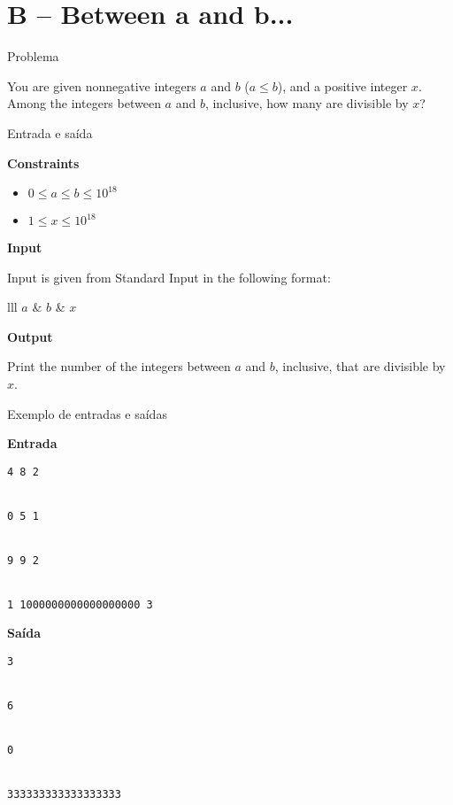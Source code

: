 \section{B -- Between a and b...}

\begin{frame}[fragile]{Problema}

You are given nonnegative integers $a$ and $b$ ($a\leq b$), and a positive integer $x$. Among 
the integers between $a$ and $b$, inclusive, how many are divisible by $x$?

\end{frame}

\begin{frame}[fragile]{Entrada e saída}

\textbf{Constraints}

\begin{itemize}
    \item $0\leq a\leq b\leq 10^{18}$
    \item $1\leq x\leq 10^{18}$
\end{itemize}

\textbf{Input}

Input is given from Standard Input in the following format:
\begin{atcoderio}{lll}
$a$ & $b$ & $x$ \\
\end{atcoderio}

\textbf{Output}

Print the number of the integers between $a$ and $b$, inclusive, that are divisible by $x$.

\end{frame}


\begin{frame}[fragile]{Exemplo de entradas e saídas}

\begin{minipage}[t]{0.45\textwidth}
\textbf{Entrada}
\begin{verbatim}
4 8 2


0 5 1


9 9 2


1 1000000000000000000 3
\end{verbatim}
\end{minipage}
\begin{minipage}[t]{0.5\textwidth}
\textbf{Saída}
\begin{verbatim}
3


6


0


333333333333333333
\end{verbatim}
\end{minipage}
\end{frame}

